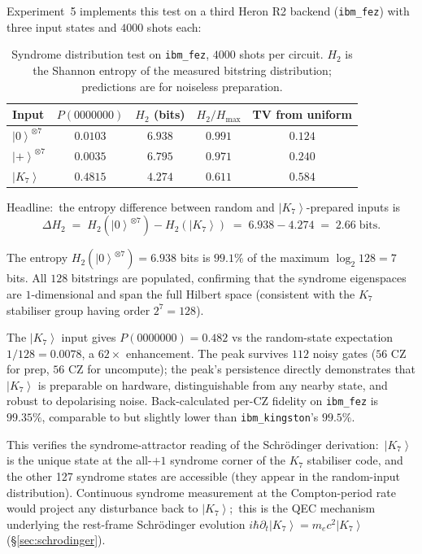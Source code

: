 \documentclass[11pt]{article}
\newcommand{\ket}[1]{\left|#1\right\rangle}
\begin{document}
Experiment~5 implements this test on a third Heron R2 backend
(\texttt{ibm\_fez}) with three input states and $4000$ shots each:

\begin{table}[H]
\centering
\caption{Syndrome distribution test on \texttt{ibm\_fez}, $4000$
shots per circuit.  $H_2$ is the Shannon entropy of the measured
bitstring distribution; predictions are for noiseless preparation.}
\label{tab:heron-exp5}
\begin{tabular}{lcccc}
\toprule
Input & $P(0000000)$ & $H_2$ (bits) & $H_2 / H_{\max}$ & TV from uniform \\
\midrule
$\ket{0}^{\otimes 7}$ & $0.0103$ & $6.938$ & $0.991$ & $0.124$ \\
$\ket{+}^{\otimes 7}$ & $0.0035$ & $6.795$ & $0.971$ & $0.240$ \\
$\ket{K_7}$           & $\boxed{0.4815}$ & $4.274$ & $0.611$ & $0.584$ \\
\bottomrule
\end{tabular}
\end{table}

\noindent
Headline:\ the entropy difference between random and
$\ket{K_7}$-prepared inputs is
\begin{equation}
  \Delta H_2 \;=\; H_2(\ket{0}^{\otimes 7}) - H_2(\ket{K_7})
              \;=\; 6.938 - 4.274
              \;=\; \boxed{2.66\;\text{bits}}.
  \label{eq:syndrome-attractor-result}
\end{equation}

The entropy $H_2(\ket{0}^{\otimes 7}) = 6.938$ bits is $99.1\%$ of
the maximum $\log_2 128 = 7$ bits.  All $128$ bitstrings are
populated, confirming that the syndrome eigenspaces are $1$-dimensional
and span the full Hilbert space (consistent with the $K_7$ stabiliser
group having order $2^7 = 128$).

The $\ket{K_7}$ input gives $P(0000000) = 0.482$ vs the random-state
expectation $1/128 = 0.0078$, a $62\times$ enhancement.  The peak
survives $112$ noisy gates ($56$ CZ for prep, $56$ CZ for uncompute);
the peak's persistence directly demonstrates that $\ket{K_7}$ is
preparable on hardware, distinguishable from any nearby state, and
robust to depolarising noise.  Back-calculated per-CZ fidelity on
\texttt{ibm\_fez} is $99.35\%$, comparable to but slightly lower
than \texttt{ibm\_kingston}'s $99.5\%$.

This verifies the syndrome-attractor reading of the Schr\"odinger
derivation:\ $\ket{K_7}$ is the unique state at the all-$+1$
syndrome corner of the $K_7$ stabiliser code, and the other 127
syndrome states are accessible (they appear in the random-input
distribution).  Continuous syndrome measurement at the Compton-period
rate would project any disturbance back to $\ket{K_7}$;\ this is the
QEC mechanism underlying the rest-frame Schr\"odinger evolution
$i\hbar \partial_t \ket{K_7} = m_e c^2 \ket{K_7}$
(\S\ref{sec:schrodinger}).
\end{document}
